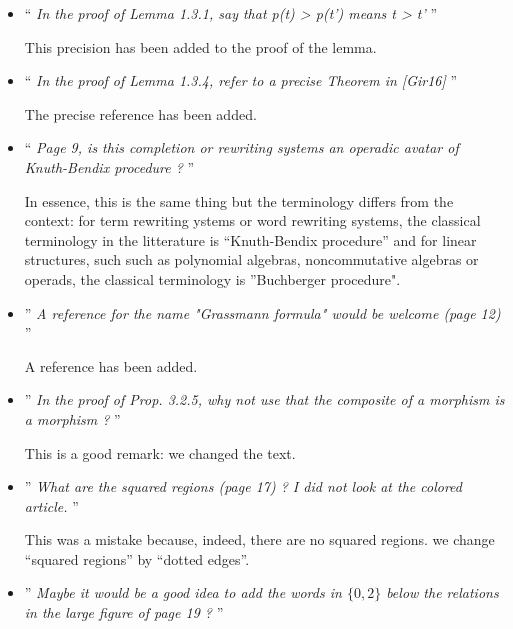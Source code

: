 \documentclass[11pt,reqno]{amsart}
\numberwithin{equation}{subsection}
\begin{document}
\begin{itemize}
\item `` {\it
In the proof of Lemma 1.3.1, say that p(t) > p(t') means t > t'
}''
\smallbreak

This precision has been added to the proof of the lemma.
\medbreak

\item `` {\it
In the proof of Lemma 1.3.4, refer to a precise Theorem in [Gir16]
}''
\smallbreak

The precise reference has been added.
\medbreak

\item ``{\it
  Page 9, is this completion or rewriting systems an operadic avatar of
  Knuth-Bendix procedure ?
}''
\smallbreak

In essence, this is the same thing but the terminology differs from
the context: for term rewriting ystems or word rewriting systems, the
classical terminology in the litterature is ``Knuth-Bendix procedure''
and for linear structures, such  such as polynomial algebras,
noncommutative algebras or operads, the classical terminology is
''Buchberger procedure".
\medbreak

\item ''{\it
A reference for the name "Grassmann formula" would be welcome (page 12)
}''
\smallbreak

A reference has been added.
\medbreak

\item ''{\it
In the proof of Prop. 3.2.5, why not use that the composite of a
morphism is a morphism ?
}''
\smallbreak

This is a good remark: we changed the text.
\medbreak

\item ''{\it
What are the squared regions (page 17) ? I did not look at the colored
article.
}''
\smallbreak

This was a mistake because, indeed, there are no squared regions. we
change ``squared regions'' by ``dotted edges''.
\medbreak

\item ''{\it
Maybe it would be a good idea to add the words in $\{0,2\}$ below the
relations in the large figure of page 19 ?
}''
\smallbreak


\end{itemize}
\end{document}
